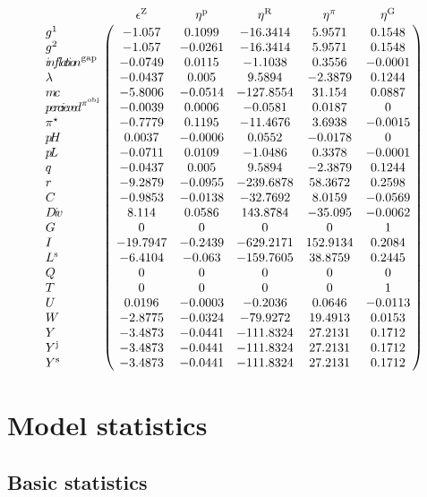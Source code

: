 $$\bordermatrix{
~ & \epsilon^{\mathrm{Z}} & \eta^{\mathrm{p}} & \eta^{\mathrm{R}} & \eta^{\pi} & \eta^{\mathrm{G}} \cr
g^{\mathrm{1}} & -1.057 & 0.1099 & -16.3414 & 5.9571 & 0.1548 \cr
g^{\mathrm{2}} & -1.057 & -0.0261 & -16.3414 & 5.9571 & 0.1548 \cr
{i\!n\!f\!l\!a\!t\!i\!o\!n}^{\mathrm{gap}} & -0.0749 & 0.0115 & -1.1038 & 0.3556 & -0.0001 \cr
\lambda & -0.0437 & 0.005 & 9.5894 & -2.3879 & 0.1244 \cr
{m\!c} & -5.8006 & -0.0514 & -127.8554 & 31.154 & 0.0887 \cr
{p\!e\!r\!c\!i\!e\!v\!e\!d}^{\pi^{\mathrm{obj}}} & -0.0039 & 0.0006 & -0.0581 & 0.0187 & 0 \cr
\pi^{\star} & -0.7779 & 0.1195 & -11.4676 & 3.6938 & -0.0015 \cr
{p\!H} & 0.0037 & -0.0006 & 0.0552 & -0.0178 & 0 \cr
{p\!L} & -0.0711 & 0.0109 & -1.0486 & 0.3378 & -0.0001 \cr
q & -0.0437 & 0.005 & 9.5894 & -2.3879 & 0.1244 \cr
r & -9.2879 & -0.0955 & -239.6878 & 58.3672 & 0.2598 \cr
C & -0.9853 & -0.0138 & -32.7692 & 8.0159 & -0.0569 \cr
{D\!i\!v} & 8.114 & 0.0586 & 143.8784 & -35.095 & -0.0062 \cr
G & 0 & 0 & 0 & 0 & 1 \cr
I & -19.7947 & -0.2439 & -629.2171 & 152.9134 & 0.2084 \cr
L^{\mathrm{s}} & -6.4104 & -0.063 & -159.7605 & 38.8759 & 0.2445 \cr
Q & 0 & 0 & 0 & 0 & 0 \cr
T & 0 & 0 & 0 & 0 & 1 \cr
U & 0.0196 & -0.0003 & -0.2036 & 0.0646 & -0.0113 \cr
W & -2.8775 & -0.0324 & -79.9272 & 19.4913 & 0.0153 \cr
Y & -3.4873 & -0.0441 & -111.8324 & 27.2131 & 0.1712 \cr
Y^{\mathrm{j}} & -3.4873 & -0.0441 & -111.8324 & 27.2131 & 0.1712 \cr
Y^{\mathrm{s}} & -3.4873 & -0.0441 & -111.8324 & 27.2131 & 0.1712 \cr
}$$


\section{Model statistics}

\subsection{Basic statistics}

